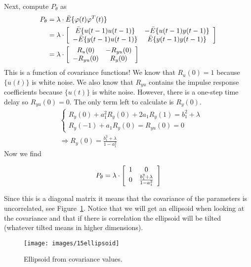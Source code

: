 \begin{example}
Next, compute $P_\theta$ as
\begin{align*}
P_\theta &= \lambda\cdot \bar{E}\{\varphi(t)\varphi^T(t)\} \\
&= \lambda\cdot \left[\begin{array}{c c}
\bar{E}\{u(t-1)u(t-1)\} & -\bar{E}\{u(t-1)y(t-1)\} \\
-\bar{E}\{y(t-1)u(t-1)\} & \bar{E}\{y(t-1)y(t-1)\}
\end{array}\right] \\
&= \lambda\cdot \left[\begin{array}{c c}
R_u(0) & -R_{yu}(0) \\ -R_{yu}(0) & R_y(0)
\end{array}\right]
\end{align*}
This is a function of covariance functions! We know that $R_u(0)=1$ because $\{u(t)\}$ is white noise.
We also know that $R_{yu}$ contains the impulse response coefficients because $\{u(t)\}$ is white noise.
However, there is a one-step time delay so $R_{yu}(0) = 0$.
The only term left to calculate is $R_y(0)$.
\begin{align*}
&\begin{cases} R_y(0) + a_1^2R_y(0)+2a_1R_y(1) = b_1^2+\lambda \\ R_y(-1)+a_1R_y(0) = R_{yu}(0) = 0 \end{cases} \\
&\Rightarrow R_y(0) = \frac{b_1^2+\lambda}{1-a_1^2}
\end{align*}
Now we find

  \begin{equation*}
P_\theta = \lambda\cdot \left[\begin{array}{c c} 1 & 0 \\ 0 & \frac{b_1^2+\lambda}{1-a_1^2} \end{array}\right]
  \end{equation*}

  Since this is a diagonal matrix it means that the covariance of the parameters is uncorrelated, see Figure~\ref{fig:15ellipsoid}.
Notice that we will get an ellipsoid when looking at the covariance and that if there is correlation the ellipsoid will be tilted (whatever tilted means in higher dimensions).

\begin{figure}[ht!]
	\centering
	\texttt{[image: images/15ellipsoid]}
	\caption{Ellipsoid from covariance values.}%
	\label{fig:15ellipsoid}
\end{figure}


\end{example}
